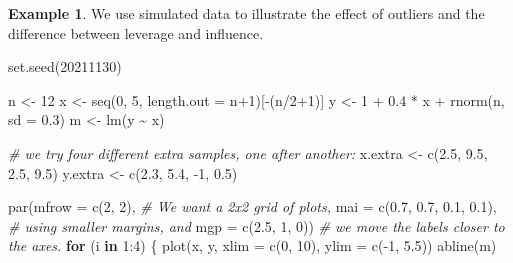 \documentclass[
  a4paper,
]{article}
\newenvironment{Shaded}{\begin{snugshade}}{\end{snugshade}}
\newcommand{\AttributeTok}[1]{\textcolor[rgb]{0.77,0.63,0.00}{#1}}
\newcommand{\CommentTok}[1]{\textcolor[rgb]{0.56,0.35,0.01}{\textit{#1}}}
\newcommand{\ControlFlowTok}[1]{\textcolor[rgb]{0.13,0.29,0.53}{\textbf{#1}}}
\newcommand{\DecValTok}[1]{\textcolor[rgb]{0.00,0.00,0.81}{#1}}
\newcommand{\FloatTok}[1]{\textcolor[rgb]{0.00,0.00,0.81}{#1}}
\newcommand{\FunctionTok}[1]{\textcolor[rgb]{0.00,0.00,0.00}{#1}}
\newcommand{\NormalTok}[1]{#1}
\newcommand{\OtherTok}[1]{\textcolor[rgb]{0.56,0.35,0.01}{#1}}
\newcommand{\SpecialCharTok}[1]{\textcolor[rgb]{0.00,0.00,0.00}{#1}}
\theoremstyle{definition}
\theoremstyle{definition}
\newtheorem{example}{Example}[section]
\theoremstyle{definition}
\theoremstyle{definition}
\theoremstyle{remark}
\begin{document}
\begin{example}
We use simulated data to illustrate the effect of outliers and
the difference between leverage and influence.

\begin{Shaded}
\begin{Highlighting}[]
\FunctionTok{set.seed}\NormalTok{(}\DecValTok{20211130}\NormalTok{)}

\NormalTok{n }\OtherTok{\textless{}{-}} \DecValTok{12}
\NormalTok{x }\OtherTok{\textless{}{-}} \FunctionTok{seq}\NormalTok{(}\DecValTok{0}\NormalTok{, }\DecValTok{5}\NormalTok{, }\AttributeTok{length.out =}\NormalTok{ n}\SpecialCharTok{+}\DecValTok{1}\NormalTok{)[}\SpecialCharTok{{-}}\NormalTok{(n}\SpecialCharTok{/}\DecValTok{2}\SpecialCharTok{+}\DecValTok{1}\NormalTok{)]}
\NormalTok{y }\OtherTok{\textless{}{-}} \DecValTok{1} \SpecialCharTok{+} \FloatTok{0.4} \SpecialCharTok{*}\NormalTok{ x }\SpecialCharTok{+} \FunctionTok{rnorm}\NormalTok{(n, }\AttributeTok{sd =} \FloatTok{0.3}\NormalTok{)}
\NormalTok{m }\OtherTok{\textless{}{-}} \FunctionTok{lm}\NormalTok{(y }\SpecialCharTok{\textasciitilde{}}\NormalTok{ x)}

\CommentTok{\# we try four different extra samples, one after another:}
\NormalTok{x.extra }\OtherTok{\textless{}{-}} \FunctionTok{c}\NormalTok{(}\FloatTok{2.5}\NormalTok{, }\FloatTok{9.5}\NormalTok{, }\FloatTok{2.5}\NormalTok{, }\FloatTok{9.5}\NormalTok{)}
\NormalTok{y.extra }\OtherTok{\textless{}{-}} \FunctionTok{c}\NormalTok{(}\FloatTok{2.3}\NormalTok{, }\FloatTok{5.4}\NormalTok{, }\SpecialCharTok{{-}}\DecValTok{1}\NormalTok{, }\FloatTok{0.5}\NormalTok{)}

\FunctionTok{par}\NormalTok{(}\AttributeTok{mfrow =} \FunctionTok{c}\NormalTok{(}\DecValTok{2}\NormalTok{, }\DecValTok{2}\NormalTok{), }\CommentTok{\# We want a 2x2 grid of plots,}
    \AttributeTok{mai =} \FunctionTok{c}\NormalTok{(}\FloatTok{0.7}\NormalTok{, }\FloatTok{0.7}\NormalTok{, }\FloatTok{0.1}\NormalTok{, }\FloatTok{0.1}\NormalTok{), }\CommentTok{\# using smaller margins, and}
    \AttributeTok{mgp =} \FunctionTok{c}\NormalTok{(}\FloatTok{2.5}\NormalTok{, }\DecValTok{1}\NormalTok{, }\DecValTok{0}\NormalTok{)) }\CommentTok{\# we move the labels closer to the axes.}
\ControlFlowTok{for}\NormalTok{ (i }\ControlFlowTok{in} \DecValTok{1}\SpecialCharTok{:}\DecValTok{4}\NormalTok{) \{}
    \FunctionTok{plot}\NormalTok{(x, y, }\AttributeTok{xlim =} \FunctionTok{c}\NormalTok{(}\DecValTok{0}\NormalTok{, }\DecValTok{10}\NormalTok{), }\AttributeTok{ylim =} \FunctionTok{c}\NormalTok{(}\SpecialCharTok{{-}}\DecValTok{1}\NormalTok{, }\FloatTok{5.5}\NormalTok{))}
    \FunctionTok{abline}\NormalTok{(m)}


\end{Highlighting}
\end{Shaded}
\end{example}
\end{document}

